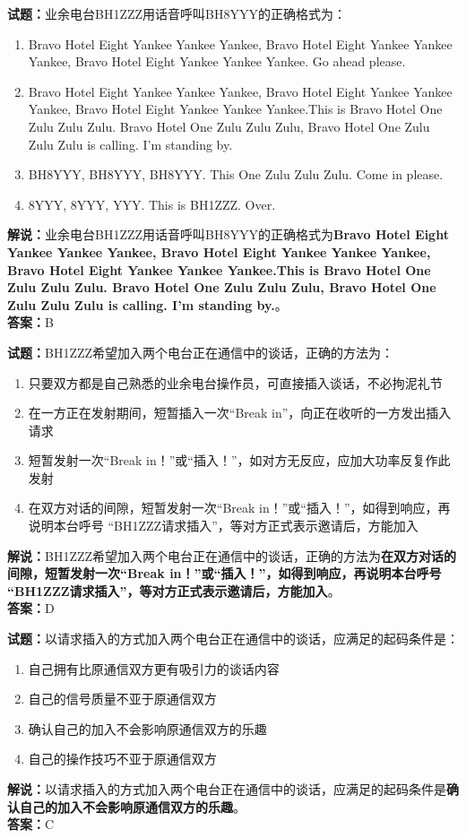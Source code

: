 \documentclass{ctexbook}
\begin{document}
\bigskip

\noindent\textbf{试题：}业余电台BH1ZZZ用话音呼叫BH8YYY的正确格式为：
\begin{enumerate}[leftmargin=3em]
  \item Bravo Hotel Eight Yankee Yankee Yankee, Bravo Hotel Eight Yankee Yankee Yankee, Bravo Hotel Eight Yankee Yankee Yankee. Go ahead please.
  \item Bravo Hotel Eight Yankee Yankee Yankee, Bravo Hotel Eight Yankee Yankee Yankee, Bravo Hotel Eight Yankee Yankee Yankee.This is Bravo Hotel One Zulu Zulu Zulu. Bravo Hotel One Zulu Zulu Zulu, Bravo Hotel One Zulu Zulu Zulu is calling. I’m standing by.
  \item BH8YYY, BH8YYY, BH8YYY. This One Zulu Zulu Zulu. Come in please.
  \item 8YYY, 8YYY, YYY. This is BH1ZZZ. Over.
\end{enumerate}
\noindent\textbf{解说：}业余电台BH1ZZZ用话音呼叫BH8YYY的正确格式为\textbf{Bravo Hotel Eight Yankee Yankee Yankee, Bravo Hotel Eight Yankee Yankee Yankee, Bravo Hotel Eight Yankee Yankee Yankee.This is Bravo Hotel One Zulu Zulu Zulu. Bravo Hotel One Zulu Zulu Zulu, Bravo Hotel One Zulu Zulu Zulu is calling. I’m standing by.}。\\\noindent\textbf{答案：}B

\bigskip

\noindent\textbf{试题：}BH1ZZZ希望加入两个电台正在通信中的谈话，正确的方法为：
\begin{enumerate}[leftmargin=3em]
  \item 只要双方都是自己熟悉的业余电台操作员，可直接插入谈话，不必拘泥礼节
  \item 在一方正在发射期间，短暂插入一次“Break in”，向正在收听的一方发出插入请求
  \item 短暂发射一次“Break in！”或“插入！”，如对方无反应，应加大功率反复作此发射
  \item 在双方对话的间隙，短暂发射一次“Break in！”或“插入！”，如得到响应，再说明本台呼号 “BH1ZZZ请求插入”，等对方正式表示邀请后，方能加入
\end{enumerate}
\noindent\textbf{解说：}BH1ZZZ希望加入两个电台正在通信中的谈话，正确的方法为\textbf{在双方对话的间隙，短暂发射一次“Break in！”或“插入！”，如得到响应，再说明本台呼号 “BH1ZZZ请求插入”，等对方正式表示邀请后，方能加入}。\\\noindent\textbf{答案：}D

\bigskip

\noindent\textbf{试题：}以请求插入的方式加入两个电台正在通信中的谈话，应满足的起码条件是：
\begin{enumerate}[leftmargin=3em]
  \item 自己拥有比原通信双方更有吸引力的谈话内容
  \item 自己的信号质量不亚于原通信双方
  \item 确认自己的加入不会影响原通信双方的乐趣
  \item 自己的操作技巧不亚于原通信双方
\end{enumerate}
\noindent\textbf{解说：}以请求插入的方式加入两个电台正在通信中的谈话，应满足的起码条件是\textbf{确认自己的加入不会影响原通信双方的乐趣}。\\\noindent\textbf{答案：}C
\end{document}

